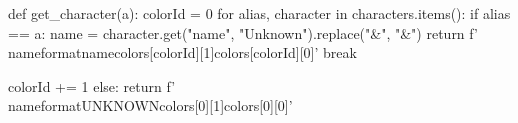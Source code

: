 
\newcommand{\characterLine}[3]{%
    \textbf{\postava{#1}} & \underline{\textit{#2}} & #3 \\ \\ %
}

\newcommand{\newpart}{%
    \noindent\makebox[\linewidth]{\rule{\maxdimen}{0.2pt}} \\[5mm]
}

\newcommand{\nameformat}[3]{%
    \textcolor[HTML]{#3}{\colorbox[HTML]{#2}{#1}}
}


\begin{pycode}
def get_character(a):
    colorId = 0
    for alias, character in characters.items():
        if alias == a:
            name = character.get("name", "Unknown").replace("&", "\&")
            return f'\\nameformat{{{name}}}{{{colors[colorId][1]}}}{{{colors[colorId][0]}}}'
            break

        colorId += 1
    else:
        return f'\\nameformat{{UNKNOWN}}{{{colors[0][1]}}}{{{colors[0][0]}}}'
\end{pycode}

\newcommand{\postava}[1]{
    \pyc{%
    print(get_character("#1"))
    }
}
